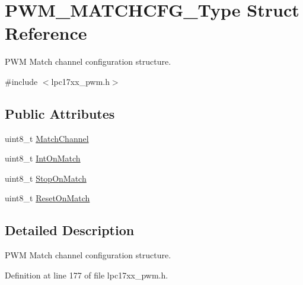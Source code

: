 \hypertarget{struct_p_w_m___m_a_t_c_h_c_f_g___type}{\section{\-P\-W\-M\-\_\-\-M\-A\-T\-C\-H\-C\-F\-G\-\_\-\-Type \-Struct \-Reference}
\label{struct_p_w_m___m_a_t_c_h_c_f_g___type}
}


\-P\-W\-M \-Match channel configuration structure.  




{\ttfamily \#include $<$lpc17xx\-\_\-pwm.\-h$>$}

\subsection*{\-Public \-Attributes}
\begin{DoxyCompactItemize}
\item 
uint8\-\_\-t \hyperlink{struct_p_w_m___m_a_t_c_h_c_f_g___type_a4308d9be7adabffc225760d3fa91ae62}{\-Match\-Channel}
\item 
uint8\-\_\-t \hyperlink{struct_p_w_m___m_a_t_c_h_c_f_g___type_ad7a2039a4d607ea0807533df6a5e2e3a}{\-Int\-On\-Match}
\item 
uint8\-\_\-t \hyperlink{struct_p_w_m___m_a_t_c_h_c_f_g___type_a632d2a5dcad18e5eef27e0bfa955064b}{\-Stop\-On\-Match}
\item 
uint8\-\_\-t \hyperlink{struct_p_w_m___m_a_t_c_h_c_f_g___type_a89909deab94be96d4d01cac6082eb1f5}{\-Reset\-On\-Match}
\end{DoxyCompactItemize}


\subsection{\-Detailed \-Description}
\-P\-W\-M \-Match channel configuration structure. 

\-Definition at line 177 of file lpc17xx\-\_\-pwm.\-h.



